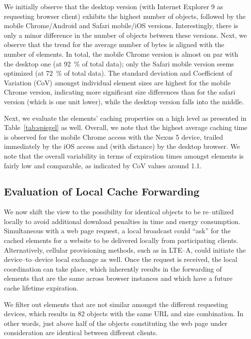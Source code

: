 \documentclass[letterpaper,conference]{IEEEtran}
\begin{document}
We initially observe that the desktop version (with Internet Explorer 9 as requesting browser client) exhibits the highest number of objects, followed by the mobile Chrome/Android and Safari mobile/iOS versions.
Interestingly, there is only a minor difference in the number of objects between these versions.
Next, we observe that the trend for the average number of bytes is aligned with the number of elements. 
In total, the mobile Chrome version is almost on par with the desktop one (at 92~\% of total data); only the Safari mobile version seems optimized (at 72~\% of total data).
The standard deviation and Coefficient of Variation (CoV) amongst individual element sizes are highest for the mobile Chrome version, indicating more significant size differences than for the safari version (which is one unit lower), while the desktop version falls into the middle.

Next, we evaluate the elements' caching properties on a high level as presented in Table~\ref{tab:spiegel} as well. 
Overall, we note that the highest average caching time is observed for the mobile Chrome access with the Nexus 5 device, trailed immediately by the iOS access and (with distance) by the desktop browser.
We note that the overall variability in terms of expiration times amongst elements is fairly low and comparable, as indicated by CoV values around 1.1.

\subsection{Evaluation of Local Cache Forwarding}
We now shift the view to the possibility for identical objects to be re--utilized locally to avoid additional download penalties in time and energy consumption.
Simultaneous with a web page request, a local broadcast could ``ask'' for the cached elements for a website to be delivered locally from participating clients. 
Alternatively, cellular provisioning methods, such as in LTE--A, could initiate the device--to--device local exchange as well.
Once the request is received, the local coordination can take place, which inherently results in the forwarding of elements that are the same across browser instances and which have a future cache lifetime expiration.

We filter out elements that are not similar amongst the different requesting devices, which results in 82 objects with the same URL and size combination. 
In other words, just above half of the objects constituting the web page under consideration are identical between different clients.
\end{document}
